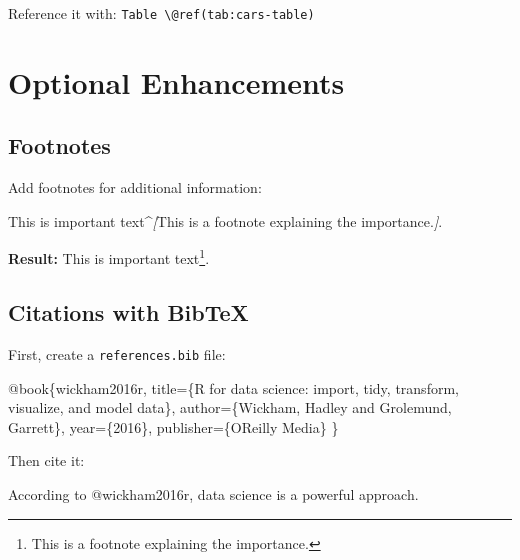 \documentclass[
]{book}
\newenvironment{Shaded}{\begin{snugshade}}{\end{snugshade}}
\newcommand{\CommentTok}[1]{\textcolor[rgb]{0.56,0.35,0.01}{\textit{#1}}}
\newcommand{\DataTypeTok}[1]{\textcolor[rgb]{0.13,0.29,0.53}{#1}}
\newcommand{\NormalTok}[1]{#1}
\newcommand{\OtherTok}[1]{\textcolor[rgb]{0.56,0.35,0.01}{#1}}
\newcommand{\VariableTok}[1]{\textcolor[rgb]{0.00,0.00,0.00}{#1}}
\begin{document}
Reference it with: \texttt{Table\ \textbackslash{}@ref(tab:cars-table)}

\section{Optional Enhancements}\label{optional-enhancements}

\subsection{Footnotes}\label{footnotes}

Add footnotes for additional information:

\begin{Shaded}
\begin{Highlighting}[]
\NormalTok{This is important text\^{}}\CommentTok{[}\OtherTok{This is a footnote explaining the importance.}\CommentTok{]}\NormalTok{.}
\end{Highlighting}
\end{Shaded}

\textbf{Result:} This is important text\footnote{This is a footnote explaining the importance.}.

\subsection{Citations with BibTeX}\label{citations-with-bibtex}

First, create a \texttt{references.bib} file:

\begin{Shaded}
\begin{Highlighting}[]
\VariableTok{@book}\NormalTok{\{}\OtherTok{wickham2016r}\NormalTok{,}
  \DataTypeTok{title}\NormalTok{=\{R for data science: import, tidy, transform, visualize, and model data\},}
  \DataTypeTok{author}\NormalTok{=\{Wickham, Hadley and Grolemund, Garrett\},}
  \DataTypeTok{year}\NormalTok{=\{2016\},}
  \DataTypeTok{publisher}\NormalTok{=\{O\textquotesingle{}Reilly Media\}}
\NormalTok{\}}
\end{Highlighting}
\end{Shaded}

Then cite it:

\begin{Shaded}
\begin{Highlighting}[]
\NormalTok{According to @wickham2016r, data science is a powerful approach.}
\end{Highlighting}
\end{Shaded}
\end{document}
